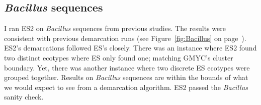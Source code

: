 %
%

\subsection*{\emph{Bacillus} sequences}
I ran ES2 on \emph{Bacillus} sequences from previous studies.
The results were consistent with previous demarcation runs (see Figure~\ref{fig:Bacillus} on page~\pageref{fig:Bacillus}).
ES2's demarcations followed ES's closely.
There was an instance where ES2 found two distinct ecotypes where ES only found one; matching GMYC's cluster boundary.
Yet, there was another instance where two discrete ES ecotypes were grouped together.
Results on \emph{Bacillus} sequences are within the bounds of what we would expect to see from a demarcation algorithm.
ES2 passed the \emph{Bacillus} sanity check.

